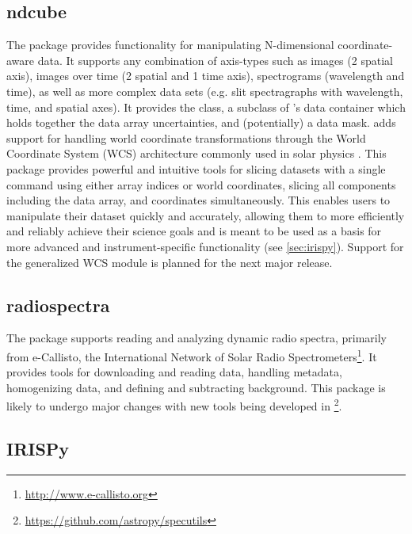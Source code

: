 \subsection{ndcube}
\label{sec:ndcube}

The  package provides functionality for manipulating N-dimensional coordinate-aware data.
It supports any combination of axis-types such as images (2 spatial axis), images over time (2 spatial and 1 time axis), spectrograms (wavelength and time), as well as more complex data sets (e.g. slit spectragraphs with wavelength, time, and spatial axes).
It provides the  class, a subclass of \astropy's  data container which holds together the data array uncertainties, and (potentially) a data mask.
 adds support for handling world coordinate transformations through the World Coordinate System (WCS) architecture commonly used in solar physics \citep{2002A&A...395.1061G}.
This package provides powerful and intuitive tools for slicing datasets with a single command using either array indices or world coordinates, slicing all components including the data array, and coordinates simultaneously.
This enables users to manipulate their dataset quickly and accurately, allowing them to more efficiently and reliably achieve their science goals and is meant to be used as a basis for more advanced and instrument-specific functionality (see \autoref{sec:irispy}).
Support for the generalized WCS module \citep{gwcs2018} is planned for the next major release.

\subsection{radiospectra}
The  package supports reading and analyzing dynamic radio spectra, primarily from e-Callisto, the International Network of Solar Radio Spectrometers\footnote{\url{http://www.e-callisto.org}}.
It provides tools for downloading and reading data, handling metadata, homogenizing data, and defining and subtracting background.
This package is likely to undergo major changes with new tools being developed in \footnote{\url{https://github.com/astropy/specutils}}.

\subsection{IRISPy}
\label{sec:irispy}

